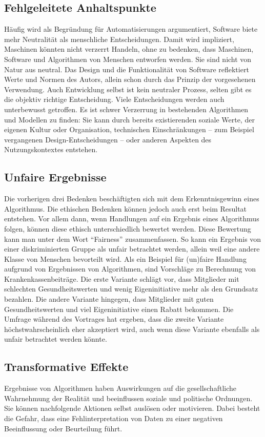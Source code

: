 \subsection{Fehlgeleitete Anhaltspunkte}
Häufig wird als Begründung für Automatisierungen argumentiert, Software biete mehr Neutralität als menschliche Entscheidungen. Damit wird impliziert, Maschinen könnten nicht verzerrt Handeln, ohne zu bedenken, dass Maschinen, Software und Algorithmen von Menschen entworfen werden. Sie sind nicht von Natur aus neutral. Das Design und die Funktionalität von Software reflektiert Werte und Normen des Autors, allein schon durch das Prinzip der vorgesehenen Verwendung. Auch Entwicklung selbst ist kein neutraler Prozess, selten gibt es die objektiv richtige Entscheidung. Viele Entscheidungen werden auch unterbewusst getroffen. Es ist schwer Verzerrung in bestehenden Algorithmen und Modellen zu finden: Sie kann durch bereits existierenden soziale Werte, der eigenen Kultur oder Organisation, technischen Einschränkungen -- zum Beispiel vergangenen Design-Entscheidungen -- oder anderen Aspekten des Nutzungskontextes entstehen.

\subsection{Unfaire Ergebnisse}

Die vorherigen drei Bedenken beschäftigten sich mit dem Erkenntnisgewinn eines Algorithmus. Die ethischen Bedenken können jedoch auch erst beim Resultat entstehen. Vor allem dann, wenn Handlungen auf ein Ergebnis eines Algorithmus folgen, können diese ethisch unterschiedlich bewertet werden. Diese Bewertung kann man unter dem Wort \enquote{Fairness} zusammenfassen. 
So kann ein Ergebnis von einer diskriminierten Gruppe als unfair betrachtet werden, allein weil eine andere Klasse von Menschen bevorteilt wird. 
Als ein Beispiel für (un)faire Handlung aufgrund von Ergebnissen von Algorithmen, sind Vorschläge zu Berechnung von Krankenkassenbeiträge. Die erste Variante schlägt vor, dass Mitglieder mit schlechten Gesundheitswerten und wenig Eigeninitiative mehr als den Grundsatz bezahlen. Die andere Variante hingegen, dass Mitglieder mit guten Gesundheitswerten und viel Eigeninitiative einen Rabatt bekommen. 
Die Umfrage während des Vortrages hat ergeben, dass die zweite Variante höchstwahrscheinlich eher akzeptiert wird, auch wenn diese Variante ebenfalls als unfair betrachtet werden könnte.


\subsection{Transformative Effekte}
Ergebnisse von Algorithmen haben Auswirkungen auf die gesellschaftliche Wahrnehmung der Realität und beeinflussen soziale und politische Ordnungen. Sie können nachfolgende Aktionen selbst auslösen oder motivieren. Dabei besteht die Gefahr, dass eine Fehlinterpretation von Daten zu einer negativen Beeinflussung oder Beurteilung führt.

